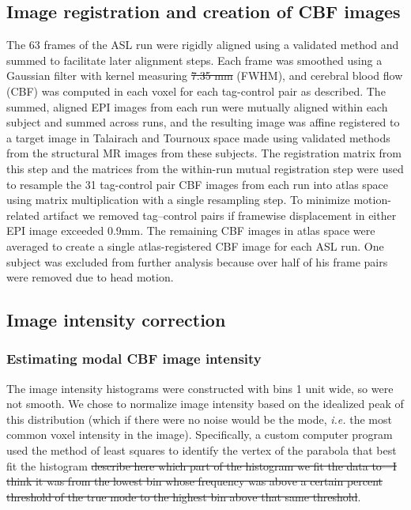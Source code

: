 \subsection{Image registration and creation of CBF images}
The 63 frames of the ASL run were rigidly aligned using a validated method\cite{Black_2001} and summed to facilitate later alignment steps. Each frame was smoothed using a Gaussian filter with kernel measuring \sout{7.35 mm} (FWHM), and cerebral blood flow (CBF) was computed in each voxel for each tag-control pair as described.\cite{Wang_2003} The summed, aligned EPI images from each run were mutually aligned within each subject and summed across runs, and the resulting image was affine registered to a target image in Talairach and Tournoux space made using validated methods from the structural MR images from these subjects.\cite{15130735} The registration matrix from this step and the matrices from the within-run mutual registration step were used to resample the 31 tag-control pair CBF images from each run into atlas space using matrix multiplication with a single resampling step. To minimize motion-related artifact we removed tag--control pairs if framewise displacement in either EPI image exceeded 0.9mm.\cite{23861343} The remaining CBF images in atlas space were averaged to create a single atlas-registered CBF image for each ASL run. One subject was excluded from further analysis because over half of his frame pairs were removed due to head motion.

\subsection{Image intensity correction}
\subsubsection{Estimating modal CBF image intensity}
The image intensity histograms were constructed with bins 1 unit wide, so were not smooth. We chose to normalize image intensity based on the idealized peak of this distribution (which if there were no noise would be the mode, \textit{i.e.} the most common voxel intensity in the image).\cite{Ojemann_1997} Specifically, a custom computer program used the method of least squares to identify the vertex of the parabola that best fit the histogram \sout{describe here which part of the histogram we fit the data to---I think it was from the lowest bin whose frequency was above a certain percent threshold of the true mode to the highest bin above that same threshold}.

